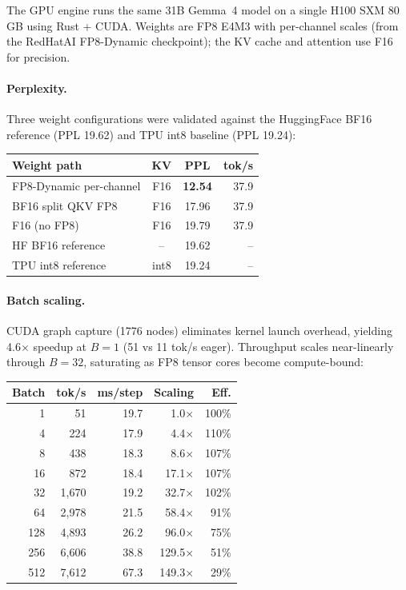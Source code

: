 The GPU engine runs the same 31B Gemma~4 model on a single H100 SXM
80\,GB using Rust + CUDA. Weights are FP8 E4M3 with per-channel scales
(from the RedHatAI FP8-Dynamic checkpoint); the KV cache and attention
use F16 for precision.

\paragraph{Perplexity.}
Three weight configurations were validated against the HuggingFace
BF16 reference (PPL 19.62) and TPU int8 baseline (PPL 19.24):

\begin{center}
\begin{tabular}{lccr}
\toprule
\textbf{Weight path} & \textbf{KV} & \textbf{PPL} & \textbf{tok/s} \\
\midrule
FP8-Dynamic per-channel & F16 & \textbf{12.54} & 37.9 \\
BF16 split QKV FP8      & F16 & 17.96 & 37.9 \\
F16 (no FP8)             & F16 & 19.79 & 37.9 \\
HF BF16 reference        & --  & 19.62 & -- \\
TPU int8 reference        & int8 & 19.24 & -- \\
\bottomrule
\end{tabular}
\end{center}

\paragraph{Batch scaling.}
CUDA graph capture (1776 nodes) eliminates kernel launch overhead,
yielding 4.6$\times$ speedup at $B{=}1$ (51 vs 11 tok/s eager).
Throughput scales near-linearly through $B{=}32$, saturating as FP8
tensor cores become compute-bound:

\begin{center}
\begin{tabular}{rrrrr}
\toprule
\textbf{Batch} & \textbf{tok/s} & \textbf{ms/step} & \textbf{Scaling} & \textbf{Eff.} \\
\midrule
1   & 51    & 19.7 & 1.0$\times$   & 100\% \\
4   & 224   & 17.9 & 4.4$\times$   & 110\% \\
8   & 438   & 18.3 & 8.6$\times$   & 107\% \\
16  & 872   & 18.4 & 17.1$\times$  & 107\% \\
32  & 1,670 & 19.2 & 32.7$\times$  & 102\% \\
64  & 2,978 & 21.5 & 58.4$\times$  & 91\%  \\
128 & 4,893 & 26.2 & 96.0$\times$  & 75\%  \\
256 & 6,606 & 38.8 & 129.5$\times$ & 51\%  \\
512 & 7,612 & 67.3 & 149.3$\times$ & 29\%  \\
\bottomrule
\end{tabular}
\end{center}

